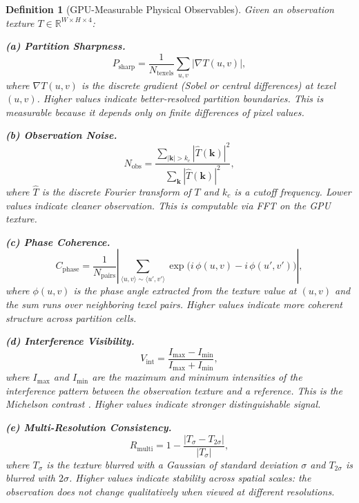 \documentclass[11pt,twocolumn,a4paper]{article}
\newtheorem{definition}[theorem]{Definition}
\newcommand{\R}{\mathbb{R}}
\begin{document}
\begin{definition}[GPU-Measurable Physical Observables]
\label{def:gpu-observables}
Given an observation texture $T \in \R^{W \times H \times 4}$:

\textbf{(a) Partition Sharpness.}
\begin{equation}
P_{\mathrm{sharp}} = \frac{1}{N_{\mathrm{texels}}}
  \sum_{u,v} |\nabla T(u,v)|,
\label{eq:sharpness}
\end{equation}
where $\nabla T(u,v)$ is the discrete gradient (Sobel or central
differences) at texel $(u,v)$. Higher values indicate better-resolved
partition boundaries. This is measurable because it depends only on
finite differences of pixel values.

\textbf{(b) Observation Noise.}
\begin{equation}
N_{\mathrm{obs}} = \frac{\sum_{|\bm{k}| > k_c}
  |\hat{T}(\bm{k})|^2}{\sum_{\bm{k}} |\hat{T}(\bm{k})|^2},
\label{eq:noise}
\end{equation}
where $\hat{T}$ is the discrete Fourier transform of $T$ and $k_c$
is a cutoff frequency. Lower values indicate cleaner observation.
This is computable via FFT on the GPU texture.

\textbf{(c) Phase Coherence.}
\begin{equation}
C_{\mathrm{phase}} = \frac{1}{N_{\mathrm{pairs}}}
  \left|\sum_{\langle u,v \rangle \sim \langle u',v' \rangle}
  \exp\!\big(i\,\phi(u,v) - i\,\phi(u',v')\big)\right|,
\label{eq:coherence}
\end{equation}
where $\phi(u,v)$ is the phase angle extracted from the texture value
at $(u,v)$ and the sum runs over neighboring texel pairs. Higher
values indicate more coherent structure across partition cells.

\textbf{(d) Interference Visibility.}
\begin{equation}
V_{\mathrm{int}} = \frac{I_{\max} - I_{\min}}{I_{\max} + I_{\min}},
\label{eq:visibility}
\end{equation}
where $I_{\max}$ and $I_{\min}$ are the maximum and minimum
intensities of the interference pattern between the observation
texture and a reference. This is the Michelson contrast
\citep{michelson1891,bornwolf1999}. Higher values indicate
stronger distinguishable signal.

\textbf{(e) Multi-Resolution Consistency.}
\begin{equation}
R_{\mathrm{multi}} = 1 - \frac{|T_\sigma - T_{2\sigma}|}{|T_\sigma|},
\label{eq:multires}
\end{equation}
where $T_\sigma$ is the texture blurred with a Gaussian of standard
deviation $\sigma$ and $T_{2\sigma}$ is blurred with $2\sigma$.
Higher values indicate stability across spatial scales: the
observation does not change qualitatively when viewed at different
resolutions.
\end{definition}
\end{document}
